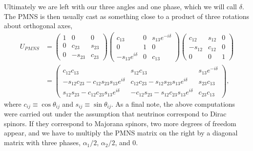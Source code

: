 Ultimately we are left with our three angles and one phase, which we will
call $\delta$. The PMNS is then usually cast as something close to a product
of three rotations about orthogonal axes,
\begin{equation}
  \begin{aligned}
    U_{PMNS}&=
    \left(\begin{array}{ccc}
      1 & 0 & 0 \\
      0 & c_{23} & s_{23} \\
      0 & -s_{23} & c_{23}
    \end{array}\right)
    \left(\begin{array}{ccc}
      c_{13} & 0 & s_{13}e^{-i\delta} \\
      0 & 1 & 0 \\
      -s_{13}e^{i\delta} & 0 & c_{13}
    \end{array}\right)
    \left(\begin{array}{ccc}
      c_{12} & s_{12} & 0 \\
      -s_{12} & c_{12} & 0 \\
      0 & 0 & 1
    \end{array}\right)\\
    &=
    \left(\begin{array}{ccc}
      c_{12}c_{13} & s_{12}c_{13} & s_{13}e^{-i\delta} \\
      -s_{12}c_{23}-c_{12}s_{23}s_{13}e^{i\delta} 
       & c_{12}c_{23}-s_{12}s_{23}s_{13}e^{i\delta} & s_{23}c_{13} \\
      s_{12}s_{23}-c_{12}c_{23}s_{13}e^{i\delta} 
       & -c_{12}s_{23}-s_{12}c_{23}s_{13}e^{i\delta} & c_{23}c_{13}
    \end{array}\right),
  \end{aligned}
\end{equation}
where $c_{ij}\equiv \cos\theta_{ij}$ and
$s_{ij}\equiv \sin\theta_{ij}$. As a final note, the above computations
were carried out under the assumption that neutrinos correspond to Dirac
spinors. If they correspond to Majorana spinors, two more degrees of freedom
appear, and we have to multiply the PMNS matrix on the right by a diagonal
matrix with three phases, $\alpha_1/2$, $\alpha_2/2$, and 0.

